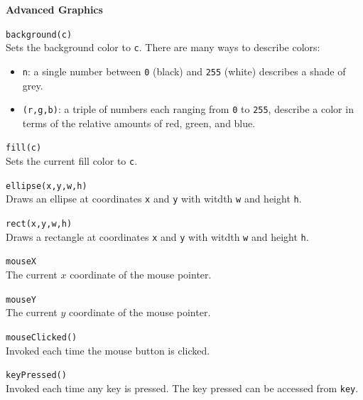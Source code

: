 \documentclass[10pt,twocolumn]{article}
\begin{document}
\noindent\textbf{\large Advanced Graphics}
\begin{description}
\item{\texttt{background(c)}}\ \\[.25em]
%
Sets the background color to \texttt{c}. There are many ways to describe colors: 
\begin{itemize}
\item \texttt{n}: a single number between \texttt{0} (black) and \texttt{255} (white) describes a shade of grey. 
\item \texttt{(r,g,b)}: a triple of numbers each ranging from
  \texttt{0} to \texttt{255}, describe a color in terms of the
  relative amounts of red, green, and blue.
\end{itemize}

\item{\texttt{fill(c)}}\ \\[.25em]
Sets the current fill color to \texttt{c}. 

\item{\texttt{ellipse(x,y,w,h)}}\ \\[.25em]
Draws an ellipse at coordinates \texttt{x} and \texttt{y} with witdth \texttt{w} and height \texttt{h}. 

\item{\texttt{rect(x,y,w,h)}}\ \\[.25em]
Draws a rectangle at coordinates \texttt{x} and \texttt{y} with witdth \texttt{w} and height \texttt{h}. 

\item{\texttt{mouseX}}\ \\[.25em]
%
The current $x$ coordinate of the mouse pointer.

\item{\texttt{mouseY}}\ \\[.25em]
%
The current $y$ coordinate of the mouse pointer.

\item{\texttt{mouseClicked()}}\ \\[.25em]
Invoked each time the mouse button is clicked.

\item{\texttt{keyPressed()}}\ \\[.25em] 
Invoked each time any key is pressed. The key pressed can be accessed
from \texttt{key}.
\end{description}
\end{document}
